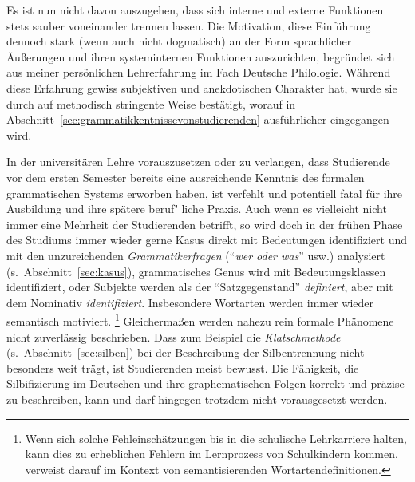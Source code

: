 
Es ist nun nicht davon auszugehen, dass sich interne und externe Funktionen stets sauber voneinander trennen lassen.
Die Motivation, diese Einführung dennoch stark (wenn auch nicht dogmatisch) an der Form sprachlicher Äußerungen und ihren systeminternen Funktionen auszurichten, begründet sich aus meiner persönlichen Lehrerfahrung im Fach Deutsche Philologie.
Während diese Erfahrung gewiss subjektiven und anekdotischen Charakter hat, wurde sie durch \citet{SchaeferSayatz2017a} auf methodisch stringente Weise bestätigt, worauf in Abschnitt~\ref{sec:grammatikkentnissevonstudierenden} ausführlicher eingegangen wird.

In der universitären Lehre vorauszusetzen oder zu verlangen, dass Studierende vor dem ersten Semester bereits eine ausreichende Kenntnis des formalen grammatischen Systems erworben haben, ist verfehlt und potentiell fatal für ihre Ausbildung und ihre spätere beruf"|liche Praxis.
Auch wenn es vielleicht nicht immer eine Mehrheit der Studierenden betrifft, so wird doch in der frühen Phase des Studiums immer wieder gerne Kasus direkt mit Bedeutungen identifiziert und mit den unzureichenden \textit{Grammatikerfragen} ("`\textit{wer oder was}"' usw.) analysiert (s.\ Abschnitt~\ref{sec:kasus}), grammatisches Genus wird mit Bedeutungsklassen identifiziert, oder Subjekte werden als der "`Satzgegenstand"' \textit{definiert}, aber mit dem Nominativ \textit{identifiziert}.
Insbesondere Wortarten werden immer wieder semantisch motiviert.%
\footnote{Wenn sich solche Fehleinschätzungen bis in die schulische Lehrkarriere halten, kann dies zu erheblichen Fehlern im Lernprozess von Schulkindern kommen.
\citet[178--179]{Bredel2013} verweist darauf im Kontext von semantisierenden Wortartendefinitionen.}
Gleichermaßen werden nahezu rein formale Phänomene nicht zuverlässig beschrieben.
Dass zum Beispiel die \textit{Klatschmethode} (s.\ Abschnitt~\ref{sec:silben}) bei der Beschreibung der Silbentrennung nicht besonders weit trägt, ist Studierenden meist bewusst.
Die Fähigkeit, die Silbifizierung im Deutschen und ihre graphematischen Folgen korrekt und präzise zu beschreiben, kann und darf hingegen trotzdem nicht vorausgesetzt werden.

